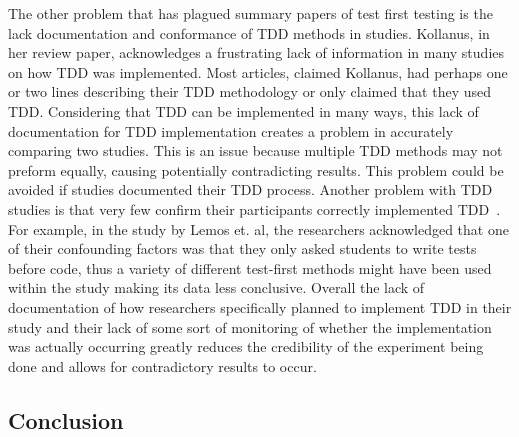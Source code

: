 \documentclass{sig-alternate}
\begin{document}
The other problem that has plagued summary papers of test first testing is the lack documentation  and conformance of TDD methods in studies.  Kollanus, in her review paper, acknowledges a frustrating lack of information in many studies on how TDD was implemented.  Most articles, claimed Kollanus, had perhaps one or two lines describing their TDD methodology or only claimed that they used TDD.  Considering that TDD can be implemented in many ways, this lack of documentation for TDD implementation creates a problem in accurately comparing two studies.  This is an issue because multiple TDD methods may not preform equally, causing potentially contradicting results.  This problem could be avoided if studies documented their TDD process.  Another problem with TDD studies is that very few confirm their participants correctly implemented TDD~\cite{Hammond:2012}.  For example, in the study by Lemos et. al, the researchers acknowledged that one of their confounding factors was that they only asked students to write tests before code, thus a variety of different test-first methods might have been used within the study making its data less conclusive.   Overall the lack of documentation of how researchers specifically planned to implement TDD in their study and their lack of some sort of monitoring of whether the implementation was actually occurring greatly reduces the credibility of the experiment being done and allows for contradictory results to occur. 

\subsection{Conclusion}
\end{document}
